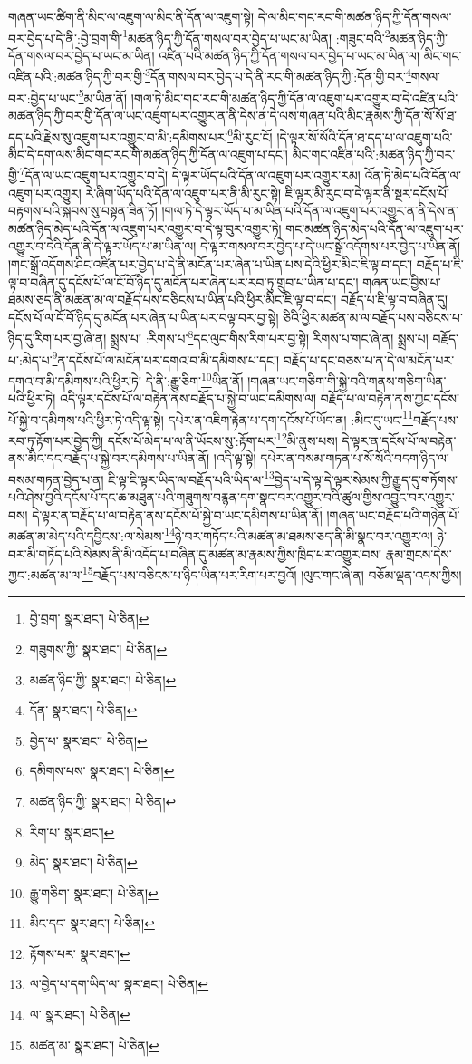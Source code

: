 གཞན་ཡང་ཚིག་ནི་མིང་ལ་འཇུག་ལ་མིང་ནི་དོན་ལ་འཇུག་སྟེ། དེ་ལ་མིང་གང་རང་གི་མཚན་ཉིད་ཀྱི་དོན་གསལ་བར་བྱེད་པ་དེ་ནི་:བྱེ་བྲག་གི་\footnote{བྱེ་བྲག་  སྣར་ཐང་།  པེ་ཅིན། }མཚན་ཉིད་ཀྱི་དོན་གསལ་བར་བྱེད་པ་ཡང་མ་ཡིན། :གཟུང་བའི་\footnote{གཟུགས་ཀྱི་  སྣར་ཐང་།  པེ་ཅིན། }མཚན་ཉིད་ཀྱི་དོན་གསལ་བར་བྱེད་པ་ཡང་མ་ཡིན། འཛིན་པའི་མཚན་ཉིད་ཀྱི་དོན་གསལ་བར་བྱེད་པ་ཡང་མ་ཡིན་ལ། མིང་གང་འཛིན་པའི་:མཚན་ཉིད་ཀྱི་བར་གྱི་\footnote{མཚན་ཉིད་ཀྱི་  སྣར་ཐང་།  པེ་ཅིན། }དོན་གསལ་བར་བྱེད་པ་དེ་ནི་རང་གི་མཚན་ཉིད་ཀྱི་:དོན་གྱི་བར་\footnote{དོན་  སྣར་ཐང་།  པེ་ཅིན། }གསལ་བར་:བྱེད་པ་ཡང་\footnote{བྱེད་པ་  སྣར་ཐང་།  པེ་ཅིན། }མ་ཡིན་ནོ། །གལ་ཏེ་མིང་གང་རང་གི་མཚན་ཉིད་ཀྱི་དོན་ལ་འཇུག་པར་འགྱུར་བ་དེ་འཛིན་པའི་མཚན་ཉིད་ཀྱི་བར་གྱི་དོན་ལ་ཡང་འཇུག་པར་འགྱུར་ན་ནི་དེས་ན་དེ་ལས་གཞན་པའི་མིང་རྣམས་ཀྱི་དོན་སོ་སོ་ཐ་དད་པའི་རྗེས་སུ་འཇུག་པར་འགྱུར་བ་མི་:དམིགས་པར་\footnote{དམིགས་པས་  སྣར་ཐང་།  པེ་ཅིན། }མི་རུང་ངོ། །དེ་ལྟར་སོ་སོའི་དོན་ཐ་དད་པ་ལ་འཇུག་པའི་མིང་དེ་དག་ལས་མིང་གང་རང་གི་མཚན་ཉིད་ཀྱི་དོན་ལ་འཇུག་པ་དང་། མིང་གང་འཛིན་པའི་:མཚན་ཉིད་ཀྱི་བར་གྱི་\footnote{མཚན་ཉིད་ཀྱི་  སྣར་ཐང་།  པེ་ཅིན། }དོན་ལ་ཡང་འཇུག་པར་འགྱུར་བ་དེ། དེ་ལྟར་ཡོད་པའི་དོན་ལ་འཇུག་པར་འགྱུར་རམ། འོན་ཏེ་མེད་པའི་དོན་ལ་འཇུག་པར་འགྱུར། རེ་ཞིག་ཡོད་པའི་དོན་ལ་འཇུག་པར་ནི་མི་རུང་སྟེ། ཇི་ལྟར་མི་རུང་བ་དེ་ལྟར་ནི་སྔར་དངོས་པོ་བརྟགས་པའི་སྐབས་སུ་བསྟན་ཟིན་ཏོ། །གལ་ཏེ་དེ་ལྟར་ཡོད་པ་མ་ཡིན་པའི་དོན་ལ་འཇུག་པར་འགྱུར་ན་ནི་དེས་ན་མཚན་ཉིད་མེད་པའི་དོན་ལ་འཇུག་པར་འགྱུར་བ་དེ་ལྟ་བུར་འགྱུར་ཏེ། གང་མཚན་ཉིད་མེད་པའི་དོན་ལ་འཇུག་པར་འགྱུར་བ་དེའི་དོན་ནི་དེ་ལྟར་ཡོད་པ་མ་ཡིན་ལ། དེ་ལྟར་གསལ་བར་བྱེད་པ་དེ་ཡང་སྒྲོ་འདོགས་པར་བྱེད་པ་ཡིན་ནོ། །གང་སྒྲོ་འདོགས་ཤིང་འཛིན་པར་བྱེད་པ་དེ་ནི་མངོན་པར་ཞེན་པ་ཡིན་པས་དེའི་ཕྱིར་མིང་ཇི་ལྟ་བ་དང་། བརྗོད་པ་ཇི་ལྟ་བ་བཞིན་དུ་དངོས་པོ་ལ་ངོ་བོ་ཉིད་དུ་མངོན་པར་ཞེན་པར་རབ་ཏུ་གྲུབ་པ་ཡིན་པ་དང་། གཞན་ཡང་བྱིས་པ་ཐམས་ཅད་ནི་མཚན་མ་ལ་བརྗོད་པས་བཅིངས་པ་ཡིན་པའི་ཕྱིར་མིང་ཇི་ལྟ་བ་དང་། བརྗོད་པ་ཇི་ལྟ་བ་བཞིན་དུ། དངོས་པོ་ལ་ངོ་བོ་ཉིད་དུ་མངོན་པར་ཞེན་པ་ཡིན་པར་བལྟ་བར་བྱ་སྟེ། ཅིའི་ཕྱིར་མཚན་མ་ལ་བརྗོད་པས་བཅིངས་པ་ཉིད་དུ་རིག་པར་བྱ་ཞེ་ན། སྨྲས་པ། :རིགས་པ་\footnote{རིག་པ་  སྣར་ཐང་། }དང་ལུང་གིས་རིག་པར་བྱ་སྟེ། རིགས་པ་གང་ཞེ་ན། སྨྲས་པ། བརྗོད་པ་:མེད་པ་\footnote{མེད་  སྣར་ཐང་།  པེ་ཅིན། }ན་དངོས་པོ་ལ་མངོན་པར་དགའ་བ་མི་དམིགས་པ་དང་། བརྗོད་པ་དང་བཅས་པ་ན་དེ་ལ་མངོན་པར་དགའ་བ་མི་དམིགས་པའི་ཕྱིར་ཏེ། དེ་ནི་:རྒྱུ་ཅིག་\footnote{རྒྱུ་གཅིག་  སྣར་ཐང་།  པེ་ཅིན། }ཡིན་ནོ། །གཞན་ཡང་གཅིག་གི་སྐྱེ་བའི་གནས་གཅིག་ཡིན་པའི་ཕྱིར་ཏེ། འདི་ལྟར་དངོས་པོ་ལ་བརྟེན་ནས་བརྗོད་པ་སྐྱེ་བ་ཡང་དམིགས་ལ། བརྗོད་པ་ལ་བརྟེན་ནས་ཀྱང་དངོས་པོ་སྐྱེ་བ་དམིགས་པའི་ཕྱིར་ཏེ་འདི་ལྟ་སྟེ། དཔེར་ན་འཇིག་རྟེན་པ་དག་དངོས་པོ་ཡོད་ན། :མིང་དུ་ཡང་\footnote{མིང་དང་  སྣར་ཐང་།  པེ་ཅིན། }བརྗོད་པས་རབ་ཏུ་རྟོག་པར་བྱེད་ཀྱི། དངོས་པོ་མེད་པ་ལ་ནི་ཡོངས་སུ་:རྟོག་པར་\footnote{རྟོགས་པར་  སྣར་ཐང་། }མི་ནུས་པས། དེ་ལྟར་ན་དངོས་པོ་ལ་བརྟེན་ནས་མིང་དང་བརྗོད་པ་སྐྱེ་བར་དམིགས་པ་ཡིན་ནོ། །འདི་ལྟ་སྟེ། དཔེར་ན་བསམ་གཏན་པ་སོ་སོའི་བདག་ཉིད་ལ་བསམ་གཏན་བྱེད་པ་ན། ཇི་ལྟ་ཇི་ལྟར་ཡིད་ལ་བརྗོད་པའི་ཡིད་ལ་\footnote{ལ་བྱེད་པ་དག་ཡིད་ལ་  སྣར་ཐང་།  པེ་ཅིན། }བྱེད་པ་དེ་ལྟ་དེ་ལྟར་སེམས་ཀྱི་རྒྱུད་དུ་གཏོགས་པའི་ཤེས་བྱའི་དངོས་པོ་དང་ཆ་མཐུན་པའི་གཟུགས་བརྙན་དག་སྣང་བར་འགྱུར་བའི་ཚུལ་གྱིས་འབྱུང་བར་འགྱུར་བས། དེ་ལྟར་ན་བརྗོད་པ་ལ་བརྟེན་ནས་དངོས་པོ་སྐྱེ་བ་ཡང་དམིགས་པ་ཡིན་ནོ། །གཞན་ཡང་བརྗོད་པའི་གཉེན་པོ་མཚན་མ་མེད་པའི་དབྱིངས་:ལ་སེམས་\footnote{ལ་  སྣར་ཐང་།  པེ་ཅིན། }ཉེ་བར་གཏོད་པའི་མཚན་མ་ཐམས་ཅད་ནི་མི་སྣང་བར་འགྱུར་ལ། ཉེ་བར་མི་གཏོད་པའི་སེམས་ནི་མི་འདོད་པ་བཞིན་དུ་མཚན་མ་རྣམས་ཀྱིས་ཁྲིད་པར་འགྱུར་བས། རྣམ་གྲངས་དེས་ཀྱང་:མཚན་མ་ལ་\footnote{མཚན་མ་  སྣར་ཐང་།  པེ་ཅིན། }བརྗོད་པས་བཅིངས་པ་ཉིད་ཡིན་པར་རིག་པར་བྱའོ། །ལུང་གང་ཞེ་ན། བཅོམ་ལྡན་འདས་ཀྱིས། 